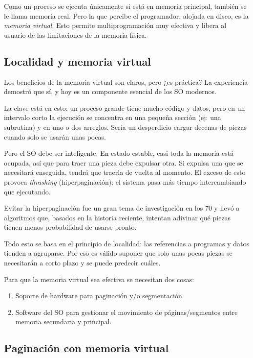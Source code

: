 Como un proceso se ejecuta únicamente si está en memoria principal, también se le llama memoria real. Pero la que percibe el programador, alojada en disco, es la \emph{memoria virtual}. Esto permite multiprogramación muy efectiva y libera al usuario de las limitaciones de la memoria física.

\subsection{Localidad y memoria virtual}

Los beneficios de la memoria virtual son claros, pero ¿es práctica? La experiencia demostró que sí, y hoy es un componente esencial de los SO modernos.

La clave está en esto: un proceso grande tiene mucho código y datos, pero en un intervalo corto la ejecución se concentra en una pequeña sección (ej: una subrutina) y en uno o dos arreglos. Sería un desperdicio cargar decenas de piezas cuando solo se usarán unas pocas.

Pero el SO debe ser inteligente. En estado estable, casi toda la memoria está ocupada, así que para traer una pieza debe expulsar otra. Si expulsa una que se necesitará enseguida, tendrá que traerla de vuelta al momento. El exceso de esto provoca \emph{thrashing} (hiperpaginación): el sistema pasa más tiempo intercambiando que ejecutando.

Evitar la hiperpaginación fue un gran tema de investigación en los 70 y llevó a algoritmos que, basados en la historia reciente, intentan adivinar qué piezas tienen menos probabilidad de usarse pronto.

Todo esto se basa en el principio de localidad: las referencias a programas y datos tienden a agruparse. Por eso es válido suponer que solo unas pocas piezas se necesitarán a corto plazo y se puede predecir cuáles.

Para que la memoria virtual sea efectiva se necesitan dos cosas:
\begin{enumerate}
  \item Soporte de hardware para paginación y/o segmentación.
  \item Software del SO para gestionar el movimiento de páginas/segmentos entre memoria secundaria y principal.
\end{enumerate}

\subsection{Paginación con memoria virtual}

